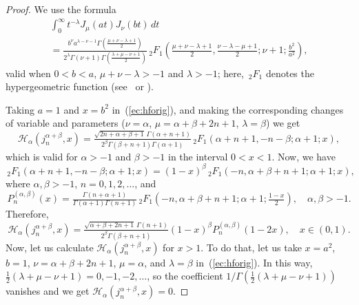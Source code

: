 \documentclass[reqno]{amsart}
\theoremstyle{plain}
\theoremstyle{definition}
\theoremstyle{remark}
\newcommand{\htr}{\mathcal{H}_\alpha} %
\newcommand{\hf}{{\,{}_2F_1}} %
\begin{document}
\begin{proof}
We use the formula
\begin{multline}
\label{ec:hforig}
   \int_0^\infty t^{-\lambda} J_\mu(at) J_\nu(bt)\,dt
   \\
   = \frac{b^\nu a^{\lambda-\nu-1}
         \Gamma(\frac{\mu+\nu-\lambda+1}2)}
         {2^\lambda \Gamma(\nu+1) \Gamma(\frac{\lambda+\mu-\nu+1}2)}
       \hf\left( \frac{\mu+\nu-\lambda+1}2,
          \frac{\nu-\lambda-\mu+1}2; \nu+1;
          \frac{b^2}{a^2} \right),
\end{multline}
valid when $0<b<a$, $\mu+\nu-\lambda>-1$ and $\lambda>-1$; here, $\hf$ denotes
the hypergeometric function (see~\cite[Ch.~8.11, (9), p.~48]{E-TIT} or
\cite[Ch.~XIII, 13.4 (2), p.~401]{Wat}).

Taking $a=1$ and $x=b^2$ in~(\ref{ec:hforig}), and making the
corresponding changes of variable and parameters ($\nu=\alpha$,
$\mu=\alpha+\beta+2n+1$, $\lambda=\beta$) we get
\begin{equation*}
    \htr(j_n^{\alpha+\beta},x)
    = \tfrac{\sqrt{2n+\alpha+\beta+1}\,\Gamma(\alpha+n+1)}
      {2^\beta \Gamma(\beta+n+1) \Gamma(\alpha+1)}
      \hf(\alpha+n+1,-n-\beta;\alpha+1;x),
\end{equation*}
which is valid for $\alpha>-1$ and $\beta>-1$ in the interval $0<x<1$.
Now, we have
\begin{equation*}
    \hf(\alpha+n+1,-n-\beta;\alpha+1;x)
    = (1-x)^\beta \hf(-n,\alpha+\beta+n+1;\alpha+1;x),
\end{equation*}
where $\alpha,\beta>-1$, $n=0,1,2,\dots$, and
\begin{equation*}
    P_n^{(\alpha,\beta)}(x) =
      \tfrac{\Gamma(n+\alpha+1)}{\Gamma(\alpha+1)\Gamma(n+1)}
      \hf(-n, \alpha+\beta+n+1; \alpha+1; \tfrac{1-x}2),
      \quad \alpha, \beta > -1.
\end{equation*}
Therefore,
\begin{equation*}
    \htr(j_n^{\alpha+\beta},x)
      = \tfrac{\sqrt{\alpha+\beta+2n+1} \, \Gamma(n+1)}
        {2^\beta \Gamma(\beta+n+1)} (1-x)^\beta P^{(\alpha,\beta)}_n(1-2x),
        \quad x \in (0,1).
\end{equation*}
Now, let us calculate $\htr(j_n^{\alpha+\beta},x)$ for $x>1$. To do that, let
us take $x=a^2$, $b=1$, $\nu=\alpha+\beta+2n+1$, $\mu=\alpha$, and
$\lambda=\beta$ in~(\ref{ec:hforig}). In this way,
$\frac12(\lambda+\mu-\nu+1) = 0,-1, -2, \dots$, so the coefficient
$1/\Gamma(\frac12(\lambda+\mu-\nu+1))$ vanishes and we get
$\htr(j_n^{\alpha+\beta},x) = 0$.
\end{proof}
\end{document}
